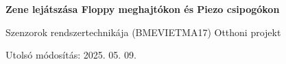 
\begin{titlepage}
    \begin{center}
        \vspace*{1cm}
            
        \Huge
        \textbf{Zene lejátszása Floppy meghajtókon és Piezo csipogókon}
            
        \vspace{0.5cm}
        \LARGE
        Szenzorok rendszertechnikája (BMEVIETMA17) Otthoni projekt
            
        \vspace{2.5cm}
            
            
        \vfill
            
            
        \vspace{0.8cm}
            
            
        \Large
        Utolsó módosítás: 2025. 05. 09.
        \vspace*{1cm}
            
    \end{center}
\end{titlepage}
